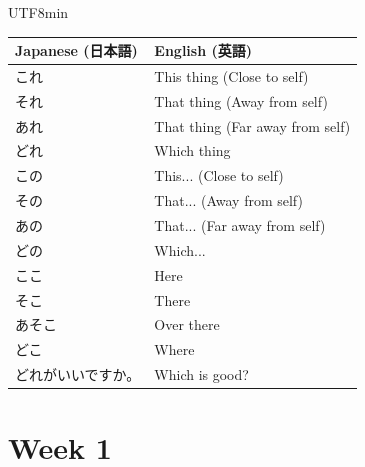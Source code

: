 \documentclass[11pt]{article}
\begin{document}
\begin{CJK}{UTF8}{min}
\begin{tabularx}{\textwidth}{X | X}
    \toprule
    \textbf{Japanese (日本語)} & \textbf{English (英語)} \\
    \midrule
    これ & This thing (Close to self) \\
    それ & That thing (Away from self) \\
    あれ & That thing (Far away from self) \\
    どれ & Which thing \\
    この & This... (Close to self) \\
    その & That... (Away from self) \\
    あの & That... (Far away from self) \\
    どの & Which... \\
    ここ & Here \\
    そこ & There \\
    あそこ & Over there \\
    どこ & Where \\
    どれがいいですか。 & Which is good? \\
    \bottomrule
\end{tabularx}


\newpage
\section{Week 1}


\end{CJK}
\end{document}
